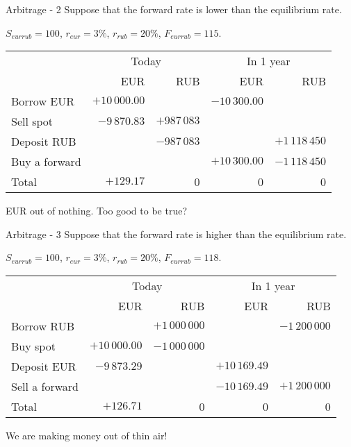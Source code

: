 \documentclass{beamer}
\begin{document}
\begin{frame}{Arbitrage - 2}
\justify
Suppose that the forward rate is lower than the equilibrium rate.

$S_{eurrub}=100$, $r_{eur}=3\%$, $r_{rub}=20\%$, $F_{eurrub}=115$. 

\justify
\centering
\small{
\begin{tabular}{l|r|r|r|r}
& \multicolumn{2}{c|}{Today} & \multicolumn{2}{c}{In 1 year} \\ \cline{2-5}
& EUR & RUB & EUR & RUB \\ \hline
Borrow EUR     & $+10\,000.00$ &                                   & $-10\,300.00$ & \\
Sell spot            & $-9\,870.83$ & $+987\,083$ &                               & \\
Deposit RUB    &                                & $-987\,083$  &                                & $+1\,118\,450$ \\
Buy a forward &                               &                                 & $+10\,300.00$ & $-1\,118\,450$ \\ \hline
Total & $+129.17$ & 0 & 0 & 0
\end{tabular}
}

 EUR out of nothing. Too good to be true?
\end{frame}



\begin{frame}{Arbitrage -  3}
\justify
Suppose that the forward rate is higher than the equilibrium rate.

 $S_{eurrub}=100$, $r_{eur}=3\%$, $r_{rub}=20\%$, $F_{eurrub}=118$. 

\justify
\centering
\small{
\begin{tabular}{l|r|r|r|r}
& \multicolumn{2}{c|}{Today} & \multicolumn{2}{c}{In 1 year} \\ \cline{2-5}
& EUR & RUB & EUR & RUB \\ \hline
Borrow RUB     &                               & $+1\,000\,000$  &                            & $-1\,200\,000$  \\
Buy spot            & $+10\,000.00$ & $-1\,000\,000$ &                               &   \\
Deposit EUR    &  $-9\,873.29$  &                                 & $+10\,169.49$ &  \\
Sell a forward &                               &                                & $-10\,169.49$ & $+1\,200\,000$ \\ \hline
Total & $+126.71$ & 0 & 0 & 0
\end{tabular}
}

\justify
We are making money out of thin air!
\end{frame}
\end{document}
